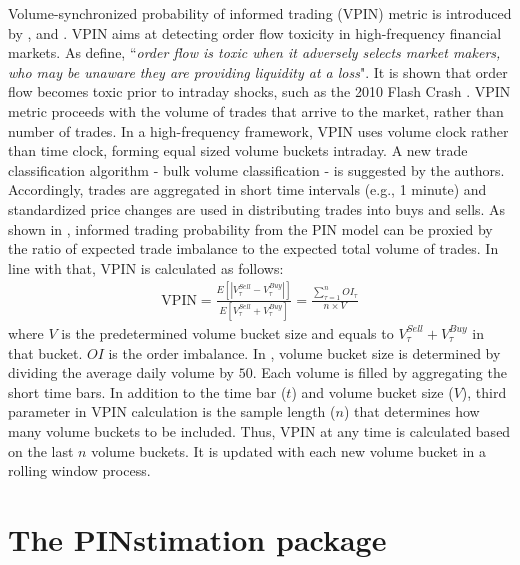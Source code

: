 Volume-synchronized probability of informed trading (VPIN) metric is introduced by \cite{Easley2011microstructure}, and \cite{Easley2012Flow}. VPIN aims at detecting order flow toxicity in high-frequency financial markets. As \cite{Easley2012Flow} define, ``\textit{order flow is toxic when it adversely selects market makers, who may be unaware they are providing liquidity at a loss}". It is shown that order flow becomes toxic prior to intraday shocks, such as the 2010 Flash Crash \citep{Easley2011microstructure}. VPIN metric proceeds with the volume of trades that arrive to the market, rather than number of trades. In a high-frequency framework, VPIN uses volume clock rather than time clock, forming equal sized volume buckets intraday. A new trade classification algorithm - bulk volume classification - is suggested by the authors. Accordingly, trades are aggregated in short time intervals (e.g., 1 minute) and standardized price changes are used in distributing trades into buys and sells. As shown in  \cite{Easley2008Time-varying}, informed trading probability from the PIN model can be proxied by the ratio of expected trade imbalance to the expected total volume of trades. In line with that, VPIN is calculated as follows:
\begin{equation}
\label{eq:vpinmetric}
\begin{split}
\mathrm{VPIN} =\frac{E\left[\left\vert V_{\tau }^{Sell }-V_{\tau}^{Buy}\right\vert \right]}{E\left[V_{\tau }^{Sell }+V_{\tau }^{Buy }\right]} =\frac{\sum_{\tau  = 1}^{n}OI_{\tau }}{n\times V}
\end{split}
\end{equation}
where $V$ is the predetermined volume bucket size and equals to \(V_{\tau }^{Sell }+V_{\tau }^{Buy }\) in that bucket. \(OI\) is the order imbalance. In  \cite{Easley2012Flow}, volume bucket size is determined by dividing the average daily volume by $50$. Each volume is filled by aggregating the short time bars. In addition to the time bar (\(t\)) and volume bucket size (\(V\)), third parameter in VPIN calculation is the sample length (\(n\)) that determines how many volume buckets to be included. Thus, VPIN at any time is calculated based on the last $n$ volume buckets. It is updated with each new volume bucket in a rolling window process. 

\section{The PINstimation package}

